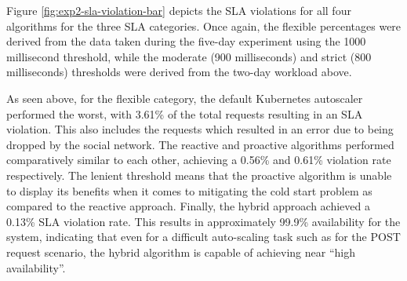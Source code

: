 \begin{center}
\begin{minipage}{\linewidth}
    \label{fig:exp2-sla-violation-bar}
\end{minipage}
\end{center}

Figure \ref{fig:exp2-sla-violation-bar} depicts the SLA violations for all four algorithms for the three SLA categories. Once again, the flexible percentages were derived from the data taken during the five-day experiment using the 1000 millisecond threshold, while the moderate (900 milliseconds) and strict (800 milliseconds) thresholds were derived from the two-day workload above.\par

As seen above, for the flexible category, the default Kubernetes autoscaler performed the worst, with 3.61\% of the total requests resulting in an SLA violation. This also includes the requests which resulted in an error due to being dropped by the social network. The reactive and proactive algorithms performed comparatively similar to each other, achieving a 0.56\% and 0.61\% violation rate respectively. The lenient threshold means that the proactive algorithm is unable to display its benefits when it comes to mitigating the cold start problem as compared to the reactive approach. Finally, the hybrid approach achieved a 0.13\% SLA violation rate. This results in approximately 99.9\% availability for the system, indicating that even for a difficult auto-scaling task such as for the POST request scenario, the hybrid algorithm is capable of achieving near ``high availability''.\par

